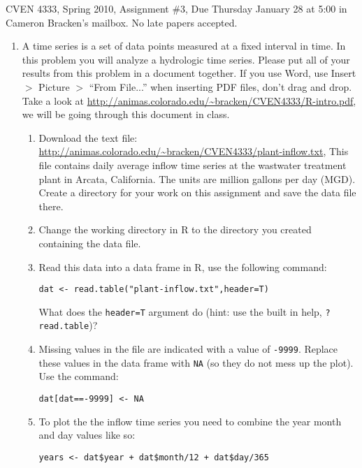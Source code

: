 \documentclass[11pt]{article}
\begin{document}
CVEN 4333, Spring 2010, Assignment \#3, Due Thursday January 28 at 5:00 in Cameron Bracken's mailbox. No late papers accepted. 

\begin{enumerate}
\item A time series is a set of data points measured at a fixed interval in time.  In this problem you will analyze a hydrologic time series.  Please put all of your results from this problem in a document together.  If you use Word, use Insert $>$ Picture $>$ ``From File...''  when inserting PDF files, don't drag and drop.  Take a look at \url{http://animas.colorado.edu/~bracken/CVEN4333/R-intro.pdf}, we will be going through this document in class. 

\begin{enumerate}

\item Download the text file: \\\url{http://animas.colorado.edu/~bracken/CVEN4333/plant-inflow.txt},  This file contains daily average inflow time series at the wastwater treatment plant in Arcata, California.  The units are million gallons per day (MGD). Create a directory for your work on this assignment and save the data file there. 

\item Change the working directory in \textsf{R} to the directory you created containing the data file. 

\item Read this data into a data frame in \textsf{R}, use the following command:
\begin{verbatim}
dat <- read.table("plant-inflow.txt",header=T)
\end{verbatim} 
What does the \texttt{header=T} argument do (hint: use the built in help, \texttt{?read.table})?

\item Missing values in the file are indicated with a value of \texttt{-9999}. Replace these values in the data frame with \texttt{NA} (so they do not mess up the plot).  Use the command:
\begin{verbatim}
dat[dat==-9999] <- NA
\end{verbatim}

\item To plot the the inflow time series you need to combine the year month and day values like so:

\begin{verbatim}
years <- dat$year + dat$month/12 + dat$day/365
\end{verbatim}


\end{enumerate}
\end{enumerate}
\end{document}

